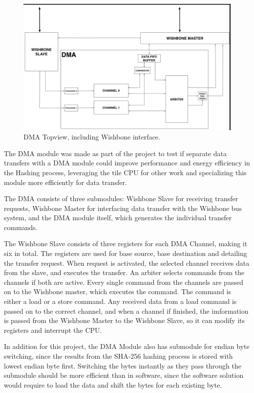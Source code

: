 \begin{figure}[htb]
    \centering
    \includegraphics[width=1.0\textwidth]{Figures/DMA/DMATopview}
    \caption{DMA Topview, including Wishbone interface.}
    \label{fig:DMATop}
\end{figure}

The DMA module was made as part of the project to test if separate data transfers with a DMA module could improve performance and energy efficiency in the Hashing process, leveraging the tile CPU for other work and specializing this module more efficiently for data transfer.

The DMA consists of three submodules: Wishbone Slave for receiving transfer requests, Wishbone Master for interfacing data transfer with the Wishbone bus system, and the DMA module itself, which generates the individual transfer commands.

The Wishbone Slave consists of three registers for each DMA Channel, making it six in total.
The registers are used for base source, base destination and detailing the transfer request.
When request is activated, the selected channel receives data from the slave, and executes the transfer.
An arbiter selects commands from the channels if both are active.
Every single command from the channels are passed on to the Wishbone master, which executes the command.
The command is either a load or a store command.
Any received data from a load command is passed on to the correct channel, and when a channel if finished, the imformation is passed from the Wishbone Master to the Wishbone Slave, so it can modify its registers and interrupt the CPU. 

In addition for this project, the DMA Module also has submodule for endian byte switching, since the results from the SHA-256 hashing process is stored with lowest endian byte first.
Switching the bytes instantly as they pass through the submodule should be more efficient than in software, since the software solution would require to load the data and shift the bytes for each existing byte.

